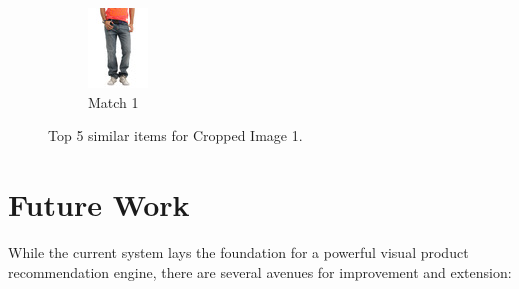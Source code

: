 \begin{figure}[H]
\begin{subfigure}[b]{0.19\textwidth}
        \includegraphics[width=\textwidth]{images/output5.jpeg}
        \caption{Match 1}
    \end{subfigure}
    \caption{Top 5 similar items for Cropped Image 1.}
    \label{fig:similar_items_1}
\end{figure}

\section*{Future Work}
While the current system lays the foundation for a powerful visual product recommendation engine, there are several avenues for improvement and extension:


